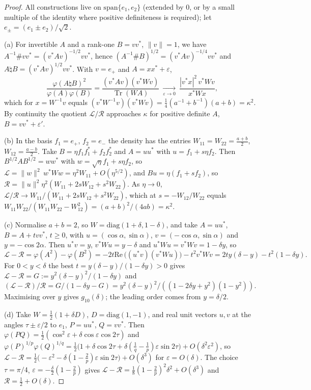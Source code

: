 \documentclass[11pt]{article}
\DeclareMathOperator{\Tr}{Tr}
\newcommand{\cL}{\mathcal{L}}
\newcommand{\cR}{\mathcal{R}}
\renewcommand{\Re}{\mathrm{Re}\,}
\theoremstyle{plain}
\theoremstyle{definition}
\theoremstyle{remark}
\begin{document}
\begin{proof}
All constructions live on $\mathrm{span}\{e_1,e_2\}$ (extended by $0$, or by a small multiple of the identity where
positive definiteness is required); let $e_\pm=(e_1\pm e_2)/\sqrt2$.

(a) For invertible $A$ and a rank-one $B=vv^*$, $\|v\|=1$, we have $A^{-1}\#vv^*=(v^*Av)^{-1/2}vv^*$, hence
$(A^{-1}\#B)^{1/2}=(v^*Av)^{-1/4}vv^*$ and $A\natural B=(v^*Av)^{1/2}vv^*$. With $v=e_+$ and $A=xx^*+\varepsilon$,
\[
  \frac{\varphi(A\natural B)^2}{\varphi(A)\varphi(B)}=\frac{(v^*Av)(v^*Wv)}{\Tr(WA)}\ \xrightarrow[\varepsilon\to0]{}\
  \frac{|v^*x|^2\,v^*Wv}{x^*Wx},
\]
which for $x=W^{-1}v$ equals $(v^*W^{-1}v)(v^*Wv)=\frac14(a^{-1}+b^{-1})(a+b)=\kappa^2$. By continuity the quotient
$\cL/\cR$ approaches $\kappa$ for positive definite $A$, $B=vv^*+\varepsilon'$.

(b) In the basis $f_1=e_+$, $f_2=e_-$ the density has the entries $W_{11}=W_{22}=\frac{a+b}2$, $W_{12}=\frac{a-b}2$. Take
$B=\eta f_1f_1^*+f_2f_2^*$ and $A=uu^*$ with $u=f_1+s\eta f_2$. Then $B^{1/2}AB^{1/2}=ww^*$ with $w=\sqrt\eta f_1+s\eta f_2$,
so $\cL=\|w\|^2\,w^*Ww=\eta^2W_{11}+O(\eta^{5/2})$, and $Bu=\eta(f_1+sf_2)$, so $\cR=\|u\|^2\eta^2(W_{11}+2sW_{12}+s^2W_{22})$.
As $\eta\to0$, $\cL/\cR\to W_{11}/(W_{11}+2sW_{12}+s^2W_{22})$, which at $s=-W_{12}/W_{22}$ equals
$W_{11}W_{22}/(W_{11}W_{22}-W_{12}^2)=(a+b)^2/(4ab)=\kappa^2$.

(c) Normalise $a+b=2$, so $W=\mathrm{diag}(1+\delta,1-\delta)$, and take $A=uu^*$, $B=A+tvv^*$, $t\ge0$, with
$u=(\cos\alpha,\sin\alpha)$, $v=(-\cos\alpha,\sin\alpha)$ and $y=-\cos2\alpha$. Then $u^*v=y$, $v^*Wu=y-\delta$ and
$u^*Wu=v^*Wv=1-\delta y$, so
\[
  \cL-\cR=\varphi(A^2)-\varphi(B^2)=-2t\Re\bigl((u^*v)(v^*Wu)\bigr)-t^2v^*Wv=2ty(\delta-y)-t^2(1-\delta y).
\]
For $0<y<\delta$ the best $t=y(\delta-y)/(1-\delta y)>0$ gives $\cL-\cR=G:=y^2(\delta-y)^2/(1-\delta y)$ and
$(\cL-\cR)/\cR=G/(1-\delta y-G)=y^2(\delta-y)^2/((1-2\delta y+y^2)(1-y^2))$. Maximising over $y$ gives $g_{10}(\delta)$; the leading
order comes from $y=\delta/2$.

(d) Take $W=\frac12(1+\delta D)$, $D=\mathrm{diag}(1,-1)$, and real unit vectors $u,v$ at the angles $\tau\pm\varepsilon/2$ to
$e_1$, $P=uu^*$, $Q=vv^*$. Then $\varphi(PQ)=\frac12(\cos^2\varepsilon+\delta\cos\varepsilon\cos2\tau)$ and
$\varphi(P)^{1/p}\varphi(Q)^{1/q}=\frac12\bigl(1+\delta\cos2\tau+\delta(\frac1q-\frac1p)\varepsilon\sin2\tau\bigr)+O(\delta^2\varepsilon^2)$,
so $\cL-\cR=\frac12\bigl(-\varepsilon^2-\delta(1-\frac2p)\varepsilon\sin2\tau\bigr)+O(\delta^3)$ for $\varepsilon=O(\delta)$. The choice
$\tau=\pi/4$, $\varepsilon=-\frac\delta2(1-\frac2p)$ gives $\cL-\cR=\frac18(1-\frac2p)^2\delta^2+O(\delta^3)$ and $\cR=\frac12+O(\delta)$.
\end{proof}
\end{document}

